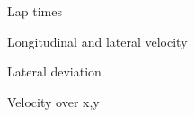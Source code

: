 
\begin{figure}[ht]
    \centering
      
    \caption{Lap times}
    \label{fig:exp_lapTime}
\end{figure}

\begin{figure}[ht]
    \centering
      
    \caption{Longitudinal and lateral velocity}
    \label{fig:exp_v}
\end{figure}

\begin{figure}[ht]
    \centering
      
    \caption{Lateral deviation}
    \label{fig:exp_e_Y}
\end{figure}

\begin{figure}[ht]
    \centering
      
    \caption{Velocity over x,y}
    \label{fig:exp_v_over_xy}
\end{figure}

